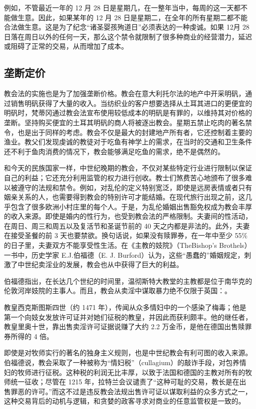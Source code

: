 例如，不管最近一年的 12 月 28 日是星期几，在一整年当中，每周的这一天都不能做生意。因此，如果某年的 12 月 28 日是星期二，在全年的所有星期二都不能合法做生意。这是为了纪念“诸圣婴孩殉道日”必须表达的一种虔诚。如果 12月 28 日落在周日以外的任何一天，那么这个禁令就限制了很多种商业的经营潜力，延迟或阻碍了正常的交易，从而增加了成本。

\subsection{垄断定价}
教会法的实施也是为了加强垄断价格。教会在意大利托尔法的地产中开采明矾，通过销售明矾获得了大量的收入。当纺织业的客户想要选择从土耳其进口的更便宜的明矾时，梵蒂冈通过教会法宣布使用较低成本的明矾是有罪的，以维持其对价格的垄断。坚持购买便宜的土耳其明矾的商人将被逐出教会。星期五禁止吃肉的著名禁令，也是出于同样的考虑。教会不仅是最大的封建地产所有者，它还控制着主要的渔业。教父们发现虔诚的教徒对于吃鱼有神学上的需求，在当时的交通和卫生条件还不利于鱼肉消费的情况下，教会能够满足吃鱼的需求，绝不是偶然的。

和今天的民族国家一样，中世纪晚期的教会，不仅对某些特定行业进行限制以保证自己的利益；它还充分利用监管的权力进行创收。教士们煞费苦心地颁布了很多难以被遵守的法规和禁令。例如，对乱伦的定义特别宽泛，即使是远房表情或者只有姻亲关系的人，也需要得到教会的特别许可才能结婚。在现代旅行出现之前，这几乎包含了很多欧洲小村庄里的每个人。于是，为乱伦婚姻出售豁免权成为教会丰厚的收入来源。即使是婚内的性行为，也受到教会法的严格限制。夫妻间的性活动，在周日、周三和周五以及复活节和圣诞节前的 40 天之内都是非法的。此外，夫妻在接受圣餐的前 3 天也要禁欲。换句话说，如果没有赎罪券，在一年中至少 55\%的日子里，夫妻双方不能享受性生活。在《主教的妓院》（TheBishop's Brothels）一书中，历史学家 E.J.伯福德（E. J. Burford）认为，这些“愚蠢的”婚姻规定，刺激了中世纪卖淫业的发展，教会也从中获得了巨大的利益。

伯福德指出，在长达几个世纪的时间里，温彻斯特大教堂的主教都是位于南华克的伦敦河岸妓院的主事人。而且，教会从卖淫中谋取暴力绝不仅限于英国：。

\begin{tcolorbox}
教皇西克斯图斯四世（约 1471 年），传闻从众多情妇中的一个感染了梅毒；他是第一个向妓女发放许可证并对她们征税的教皇，并因此而获利颇丰。他的继任者，教皇里奥十世，靠出售卖淫许可证据说赚了大约 2.2 万金币，是他在德国出售赎罪券所得的 4 倍。
\end{tcolorbox}


即使是对牧师实行的著名的独身主义规则，也是中世纪教会有利可图的收入来源。伯福德说，教会采取了一种被称为“情妇税”（cullagium）的敲诈手段，对包养情妇的牧师进行征税。这种税的利润无比丰厚，以致于法国和德国的主教对所有的牧师统一征收；尽管在 1215 年，拉特兰会议谴责了“这种可耻的交易，教长是在出售罪恶的许可。”而这不过是违反教会法规出售许可证以谋取利益的众多方式之一，这种交易背后的动机与逻辑，和贪婪的政客寻求对商业的任意监管权是一致的。

